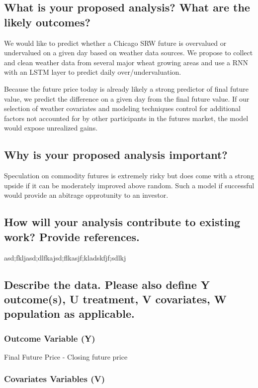 \documentclass[twoside,11pt]{article}
\begin{document}
\subsection{What is your proposed analysis? What are the likely outcomes?}

We would like to predict whether a Chicago SRW future is overvalued or undervalued on a given day based on weather data sources. We propose to collect and clean weather data from several major wheat growing areas and use a RNN with an LSTM layer to predict daily over/undervaluation. 

Because the future price today is already likely a strong predictor of final future value, we predict the difference on a given day from the final future value. If our selection of weather covariates and modeling techniques control for additional factors not accounted for by other participants in the futures market, the model would expose unrealized gains.  

\subsection{Why is your proposed analysis important?}

Speculation on commodity futures is extremely risky but does come with a strong upside if it can be moderately improved above random. Such a model if successful would provide an abitrage opprotunity to an investor. 

\subsection{How will your analysis contribute to existing work? Provide references.}

asd;fkljasd;dlfkajsd;flkasjf;kladskfjf;sdlkj

\subsection{Describe the data. Please also define Y outcome(s), U treatment, V covariates, W population as applicable.}

\subsubsection{Outcome Variable (Y)}
Final Future Price - Closing future price

\subsubsection{Covariates Variables (V)}
\end{document}
